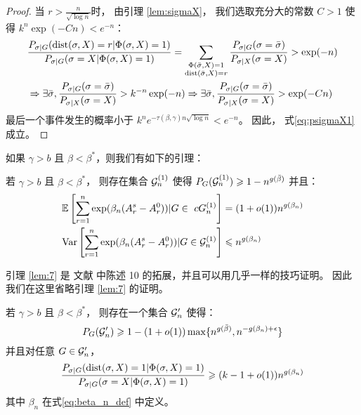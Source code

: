 \begin{proof}
  当 $r>\frac{n}{\sqrt{\log n}}$时，
  由引理 \ref{lem:sigmaX}，
  我们选取充分大的常数  $C>1$
  使得 $k^n\exp(-Cn) < e^{-n}$：
  \begin{align*}
  &\frac{P_{\sigma|G}(\operatorname{dist}(\sigma, X)=r | \Phi(\sigma, X)=1)}
  {P_{\sigma|G}(\sigma=X | \Phi(\sigma, X)=1)} = 
  \sum_{\substack{\Phi(\bar{\sigma}, X)=1 \\ 
  \operatorname{dist}(\bar{\sigma}, X)=r}} \frac{P_{\sigma | G}(\sigma = \bar{\sigma}) }{P_{\sigma | X}(\sigma = X)} > \exp(-n)\\
  &\Rightarrow \exists \bar{\sigma},
  \frac{P_{\sigma | G}(\sigma = \bar{\sigma}) }{P_{\sigma | X}(\sigma = X)} > k^{-n}\exp(-n)
  \Rightarrow \exists \bar{\sigma},
  \frac{P_{\sigma | G}(\sigma = \bar{\sigma}) }{P_{\sigma | X}(\sigma = X)} > \exp(-Cn)\\
  \end{align*}
  最后一个事件发生的概率小于 $k^ne^{-\tau(\beta, \gamma) n\sqrt{\log n}}<e^{-n}$。
  因此，    式\eqref{eq:psigmaX1}成立。
  \end{proof}

  如果 $\gamma > b$ 且 $\beta < \beta^*$，则我们有如下的引理：
 \begin{lemma}\label{lem:7}
	若 $\gamma > b$ 且 $\beta < \beta^*$，
  则存在集合 $\mathcal{G}^{(1)}_n$ 使得
	$P_G(\mathcal{G}^{(1)}_n) \geqslant 1-n^{g(\bar{\beta})}$
	并且：
 \begin{align}
	\mathbb{E}\left[
    \sum_{r=1}^n \exp(\beta_n (A_r^s - A_r^0)) | G \in \   cG^{(1)}_n\right] &= (1+o(1))n^{g(\beta_n)} \\
	\operatorname{\mathrm{Var}} \left[
    \sum_{r=1}^n \exp(\beta_n (A_r^s - A_r^0)) | G \in \mathcal{G}^{(1)}_n
    \right] &\leqslant n^{g(\beta_n)}
	\end{align}
\end{lemma}
引理 \ref{lem:7} 是 文献  中陈述 10 
的拓展，并且可以用几乎一样的技巧证明。
因此我们在这里省略引理 \ref{lem:7} 的证明。

\begin{lemma}\label{prop:large2}
	若 $\gamma > b$ 且 $\beta < \beta^*$，
 则存在一个集合 $\mathcal{G}'_n$ 使得：
\begin{equation}
	P_G(\mathcal{G}'_n) \geqslant 1 - (1+o(1))\max\{n^{g(\bar{\beta})}, n^{- g(\beta_n) + \epsilon} \}
	\end{equation}
	并且对任意 $G \in \mathcal{G}'_n$，
\begin{equation}\label{eq:diff1g}
	\frac{P_{\sigma|G}(\operatorname{dist}(\sigma, X)=1 | \Phi(\sigma, X)=1)}
	{P_{\sigma|G}(\sigma=X | \Phi(\sigma, X)=1)} \geqslant (k-1+o(1))n^{g(\beta_n)}
	\end{equation}
  其中 $\beta_n$ 在式\eqref{eq:beta_n_def} 中定义。
\end{lemma}

